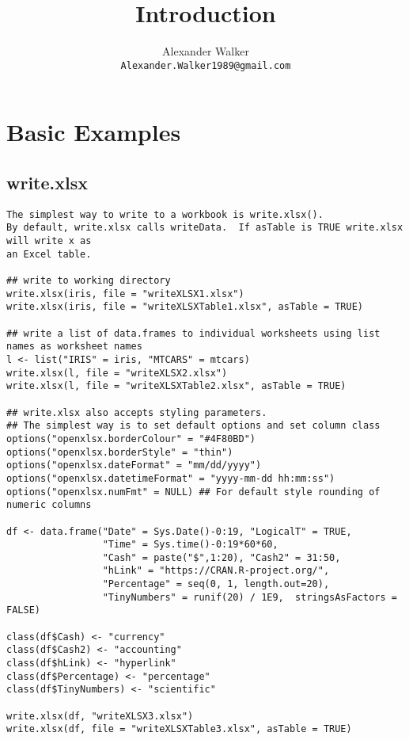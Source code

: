 \documentclass[11pt]{article}\usepackage[]{graphicx}\usepackage[]{color}
\begin{document}
\title{Introduction}
\author{Alexander Walker\\
\texttt{Alexander.Walker1989@gmail.com}}
\maketitle


\newpage
\section{Basic Examples}
\subsection{write.xlsx}
\begin{verbatim}
The simplest way to write to a workbook is write.xlsx().
By default, write.xlsx calls writeData.  If asTable is TRUE write.xlsx will write x as
an Excel table.

## write to working directory
write.xlsx(iris, file = "writeXLSX1.xlsx")
write.xlsx(iris, file = "writeXLSXTable1.xlsx", asTable = TRUE)

## write a list of data.frames to individual worksheets using list names as worksheet names
l <- list("IRIS" = iris, "MTCARS" = mtcars)
write.xlsx(l, file = "writeXLSX2.xlsx")
write.xlsx(l, file = "writeXLSXTable2.xlsx", asTable = TRUE)

## write.xlsx also accepts styling parameters.
## The simplest way is to set default options and set column class
options("openxlsx.borderColour" = "#4F80BD")
options("openxlsx.borderStyle" = "thin")
options("openxlsx.dateFormat" = "mm/dd/yyyy")
options("openxlsx.datetimeFormat" = "yyyy-mm-dd hh:mm:ss")
options("openxlsx.numFmt" = NULL) ## For default style rounding of numeric columns

df <- data.frame("Date" = Sys.Date()-0:19, "LogicalT" = TRUE,
                 "Time" = Sys.time()-0:19*60*60,
                 "Cash" = paste("$",1:20), "Cash2" = 31:50,
                 "hLink" = "https://CRAN.R-project.org/",
                 "Percentage" = seq(0, 1, length.out=20),
                 "TinyNumbers" = runif(20) / 1E9,  stringsAsFactors = FALSE)

class(df$Cash) <- "currency"
class(df$Cash2) <- "accounting"
class(df$hLink) <- "hyperlink"
class(df$Percentage) <- "percentage"
class(df$TinyNumbers) <- "scientific"

write.xlsx(df, "writeXLSX3.xlsx")
write.xlsx(df, file = "writeXLSXTable3.xlsx", asTable = TRUE)






\end{verbatim}
\end{document}
